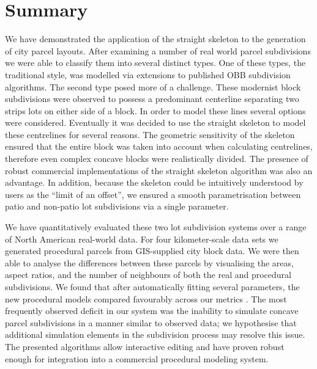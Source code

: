 \section{Summary}




We have demonstrated the application of the straight skeleton to the generation of city parcel layouts. After examining a number of real world parcel subdivisions we were able to classify them into several distinct types. One of these types, the traditional style, was modelled via extensions to published OBB subdivision algorithms. The second type posed more of a challenge. These modernist block subdivisions were observed to possess a predominant centerline separating two strips lots on either side of a block. In order to model these lines several options were considered. Eventually it was decided to use the straight skeleton to model these centrelines for several reasons. The geometric sensitivity of the skeleton ensured that the entire block was taken into account when calculating centrelines, therefore even complex concave blocks were realistically divided. The presence of  robust commercial implementations of the straight skeleton algorithm was also an advantage. In addition, because the skeleton could be intuitively understood by users as the ``limit of an offset'', we ensured a smooth parametrisation between patio and non-patio lot subdivisions via a single parameter.  

We have quantitatively evaluated these two lot subdivision systems over a range of North American real-world data. For four  kilometer-scale data sets we generated procedural parcels from GIS-supplied city block data. We were then able to analyse the differences between these parcels by visualising the areas, aspect ratios, and the number of neighbours of both the real and procedural subdivisions. We found that after automatically fitting several parameters, the new procedural models compared favourably across our metrics . The most frequently observed deficit in our system was the inability to simulate concave parcel subdivisions in a manner similar to observed data; we hypothesise that additional simulation elements in the subdivision process may resolve this issue.
The presented algorithms allow interactive editing and have proven robust enough for integration into a commercial procedural modeling system. 



